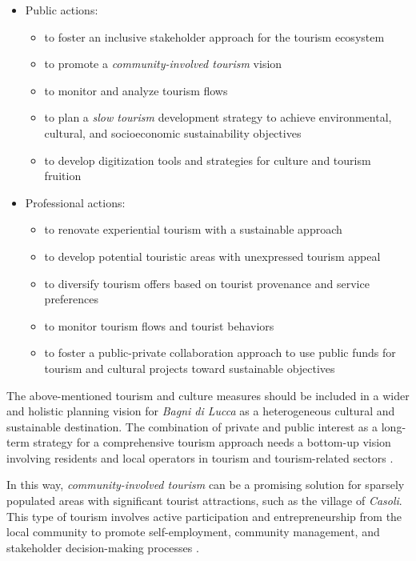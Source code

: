 \documentclass[sustainability,article,submit,pdftex,moreauthors]{Definitions/mdpi}
\begin{document}
\begin{itemize}

\item Public actions: 
\begin{itemize}
\item to foster an inclusive stakeholder approach for the tourism ecosystem 
\item to promote a \textit{community-involved tourism} vision 
\item to monitor and analyze tourism flows 
\item to plan a \emph{slow tourism} development strategy to achieve environmental, cultural, and socioeconomic sustainability objectives 
\item to develop digitization tools and strategies for culture and tourism fruition
\end{itemize}

\item Professional actions: 
\begin{itemize}
\item to renovate experiential tourism with a sustainable approach 
\item to develop potential touristic areas with unexpressed tourism appeal 
\item to diversify tourism offers based on tourist provenance and service preferences 
\item to monitor tourism flows and tourist behaviors 
\item to foster a public-private collaboration approach to use public funds for tourism and cultural projects toward sustainable objectives 
\end{itemize}

\end{itemize}

The above-mentioned tourism and culture measures should be included in a wider and holistic planning vision for \emph{Bagni di Lucca} as a heterogeneous cultural and sustainable destination. The combination of private and public interest as a long-term strategy for a comprehensive tourism approach needs a bottom-up vision involving residents and local operators in tourism and tourism-related sectors \cite{lem20, lem22}.

In this way, \textit{community-involved tourism} can be a promising solution for sparsely populated areas with significant tourist attractions, such as the village of \emph{Casoli}. This type of tourism involves active participation and entrepreneurship from the local community to promote self-employment, community management, and stakeholder decision-making processes \cite{nag15}.
\end{document}

